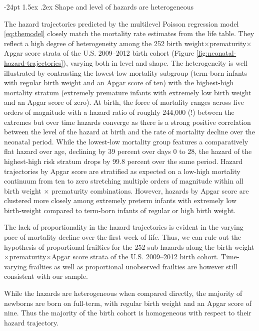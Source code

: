 \documentclass[10pt,twoside,reqno]{article}
\makeatletter
\renewcommand\subsection{\@startsection{subsection}{2}{\z@}%
                                     {-24pt}%
                                     {1.5ex \@plus .2ex}%
                                     {\normalfont\normalsize\bfseries}}
\makeatother
\begin{document}
\subsection{Shape and level of hazards are heterogeneous}\label{shape-and-level-of-hazards-are-heterogeneous}

The hazard trajectories predicted by the multilevel Poisson regression model \eqref{eq:themodel} closely match the mortality rate estimates from the life table. They reflect a high degree of heterogeneity among the 252 birth weight\(\times\)prematurity\(\times\)Apgar score strata of the U.S. 2009--2012 birth cohort (Figure \ref{fig:neonatal-hazard-trajectories}), varying both in level and shape. The heterogeneity is well illustrated by contrasting the lowest-low mortality subgroup (term-born infants with regular birth weight and an Apgar score of ten) with the highest-high mortality stratum (extremely premature infants with extremely low birth weight and an Apgar score of zero). At birth, the force of mortality ranges across five orders of magnitude with a hazard ratio of roughly 244,000 (!) between the extremes but over time hazards converge as there is a strong positive correlation between the level of the hazard at birth and the rate of mortality decline over the neonatal period. While the lowest-low mortality group features a comparatively flat hazard over age, declining by 39 percent over days 0 to 28, the hazard of the highest-high risk stratum drops by 99.8 percent over the same period. Hazard trajectories by Apgar score are stratified as expected on a low-high mortality continuum from ten to zero stretching multiple orders of magnitude within all birth weight \(\times\) prematurity combinations. However, hazards by Apgar score are clustered more closely among extremely preterm infants with extremely low birth-weight compared to term-born infants of regular or high birth weight.

The lack of proportionality in the hazard trajectories is evident in the varying pace of mortality decline over the first week of life. Thus, we can rule out the hypothesis of proportional frailties for the 252 sub-hazards along the birth weight\(\times\)prematurity\(\times\)Apgar score strata of the U.S. 2009--2012 birth cohort. Time-varying frailties as well as proportional unobserved frailties are however still consistent with our sample.

While the hazards are heterogeneous when compared directly, the majority of newborns are born on full-term, with regular birth weight and an Apgar score of nine. Thus the majority of the birth cohort is homogeneous with respect to their hazard trajectory.
\end{document}

